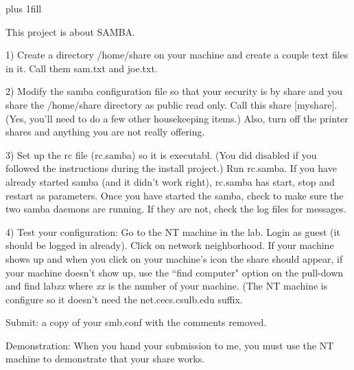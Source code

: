 
\rightskip=0pt plus 1fill

\parindent 0pt

This project is about SAMBA.

1) Create a directory {\ltt{}/home/share} on your machine and
create a couple text files in it. Call them {\ltt{}sam.txt} and 
{\ltt{}joe.txt}.

2) Modify the samba configuration file so that your security is by
share and you share the {\ltt{}/home/share} directory as public
read only. Call this share {\ltt{}[myshare]}. (Yes, you'll need
to do a few other housekeeping items.)
Also, turn off the printer shares and anything you are not really
offering.

3) Set up the rc file ({\ltt{}rc.samba}) so it is executabl.
(You did disabled if you followed the instructions during the install
project.) Run {\ltt{}rc.samba}.
If you have already started samba (and it didn't work right), 
{\ltt{}rc.samba} has start, stop and restart as parameters.
Once you have started the samba,
check to make sure the two samba daemons are running.
If they are not, check the log files for messages.

4) Test your configuration: Go to the NT machine in the lab.
Login as guest (it should be logged in already). Click on network 
neighborhood. If your machine shows up and when you click on
your machine's icon the share should appear, if your
machine doesn't show up, use the ``find computer" option on the pull-down
and find {\ltt{}lab}{\it{}xx} where {\it xx} is the number of your machine.
(The NT machine is configure so it doesn't need the {\ltt{}net.cecs.csulb.edu}
suffix.

Submit: a copy of your smb.conf with the comments removed.

Demonstration: When you hand your submission to me, you must use the NT machine
to demonstrate that your share works.
\bye
